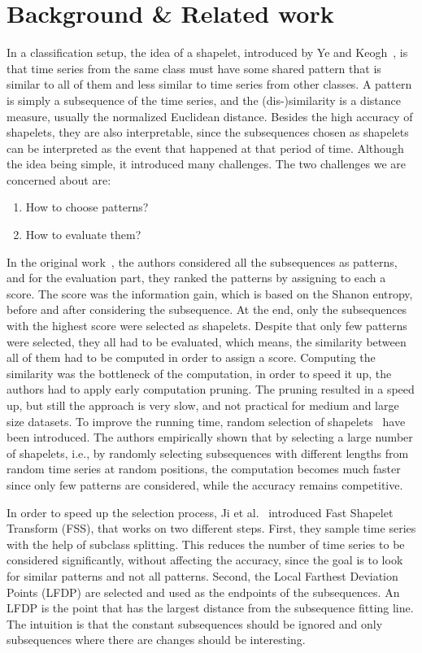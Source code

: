 \documentclass[sigconf, nonacm]{acmart}
\begin{document}
\section{Background \& Related work}
In a classification setup, the idea of a shapelet, introduced by Ye and 
Keogh~\cite{keogh_shapelet}, is that time series from the same class must have 
some shared pattern that is similar to all of them and less similar to time 
series from other classes. A pattern is simply a subsequence of the time series,
and the (dis-)similarity is a distance measure, usually the normalized Euclidean
distance. Besides the high accuracy of shapelets, they are also interpretable,
since the subsequences chosen as shapelets can be interpreted as the event that
happened at that period of time.
Although the idea being simple, it introduced many challenges. The two 
challenges we are concerned about are:
\begin{enumerate}
  \item How to choose patterns?
  \item How to evaluate them?
\end{enumerate}
In the original work~\cite{keogh_shapelet}, the authors considered all the 
subsequences as patterns, and for the evaluation part, they ranked the patterns
by assigning to each a score. The score was the information gain, which is based
on the Shanon entropy, before and after considering the subsequence. At the end,
only the subsequences with the highest score were selected as shapelets.
Despite that only few patterns were selected, they all had to be evaluated,
which means, the similarity between all of them had to be computed in order to 
assign a score. Computing the similarity was the bottleneck of the computation,
in order to speed it up, the authors had to apply early computation pruning.
The pruning resulted in a speed up, but still the approach is very slow,
and not practical for medium and large size datasets. To improve the running 
time, random selection of shapelets~\cite{random_shapelets} have been 
introduced. The authors empirically shown that by selecting a large number of
shapelets, i.e., by randomly selecting subsequences with different lengths from 
random time series at random positions, the computation becomes much faster
since only few patterns are considered, while the accuracy remains competitive.

In order to speed up the selection process, Ji et al.~\cite{fss} introduced 
Fast Shapelet Transform (FSS), that works on two different steps. First, they 
sample  time series with the help of subclass splitting. This reduces the 
number of time series to be considered significantly, without affecting the 
accuracy, since the goal is to look for similar patterns and not all patterns.
Second, the Local Farthest Deviation Points (LFDP) are selected and used as the
endpoints of the subsequences. An LFDP is the point that has the largest 
distance from the subsequence fitting line. The intuition is that the constant
subsequences should be ignored and only subsequences where there are changes
should be interesting.
\end{document}
